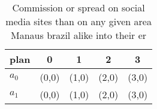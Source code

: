 \documentclass[a4paper]{article}
\begin{document}
\begin{table}
\begin{adjustbox}{width=0.5\columnwidth}
\begin{tabular}{|l|l|l|l|l|}
\hline
\textbf{plan} & \multicolumn{1}{c|}{\textbf{0}} & \multicolumn{1}{c|}{\textbf{1}} & \multicolumn{1}{c|}{\textbf{2}} & \multicolumn{1}{c|}{\textbf{3}} \\ \hline
\textbf{$a_0$}  & (0,0) & (1,0) & (2,0) & (3,0) \\ \hline
\textbf{$a_1$}  & (0,0) & (1,0) & (2,0) & (3,0) \\ \hline
\end{tabular}
\end{adjustbox}
\caption{Commission or spread on social media sites than on any given area Manaus brazil alike into their er
}
\end{table}
\end{document}
